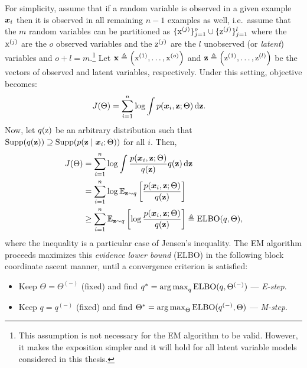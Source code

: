 For simplicity, assume that if a random variable is observed in a given example ${\bm{x}}_i$ then it is observed in all remaining $n-1$ examples as well, i.e.\ assume that the $m$ random variables can be partitioned as $\lbrace {\textnormal{x}}^{(j)} \rbrace_{j=1}^o \cup \lbrace {\textnormal{z}}^{(j)} \rbrace_{j=1}^l$ where the ${\textnormal{x}}^{(j)}$ are the $o$ observed variables and the ${\textnormal{z}}^{(j)}$ are the $l$ unobserved (or \emph{latent}) variables and $o+l=m$.\footnote{This assumption is not necessary for the EM algorithm to be valid. However, it makes the exposition simpler and it will hold for all latent variable models considered in this thesis.} Let ${\mathbf{x}} \triangleq \left({\textnormal{x}}^{(1)}, \dots, {\textnormal{x}}^{(o)} \right)$ and ${\mathbf{z}} \triangleq \left({\textnormal{z}}^{(1)}, \dots, {\textnormal{z}}^{(l)} \right)$ be the vectors of observed and latent variables, respectively. Under this setting, objective  becomes:
\begin{align}
    \label{eq:maximum_marginal_likelihood}
    J(\Theta) &= \sum_{i=1}^n \log \int p({\bm{x}}_i, {\mathbf{z}}; \Theta) {\,\text{d}} {\mathbf{z}}.
\end{align}
Now, let $q({\textnormal{z}})$ be an arbitrary distribution such that $\mathrm{Supp}(q({\mathbf{z}})) \supseteq \mathrm{Supp}(p({\mathbf{z}} \mid {\bm{x}}_i; \Theta))$ for all $i$. Then,
\begingroup
\allowdisplaybreaks
\begin{align}
    J(\Theta) &= \sum_{i=1}^n \log \int \frac{p({\bm{x}}_i, {\mathbf{z}}; \Theta)}{q({\mathbf{z}})} q({\mathbf{z}}) {\,\text{d}} {\mathbf{z}} \nonumber\\
    &= \sum_{i=1}^n \log \mathbb{E}_{{\mathbf{z}} \sim q} \left[ \frac{p({\bm{x}}_i, {\mathbf{z}}; \Theta)} {q({\mathbf{z}})} \right] \nonumber\\
    &\geq \sum_{i=1}^n \mathbb{E}_{{\mathbf{z}} \sim q} \left[ \log  \frac{p({\bm{x}}_i, {\mathbf{z}}; \Theta)}{q({\mathbf{z}})} \right] \triangleq \mathrm{ELBO}(q,\Theta),
\end{align}
\endgroup
where the inequality is a particular case of Jensen's inequality. The EM algorithm proceeds maximizes this \emph{evidence lower bound} (ELBO) in the following block coordinate ascent manner, until a convergence criterion is satisfied:
\begin{itemize}
    \item Keep $\Theta = \Theta^{(-)}$ (fixed) and find $q^* = \operatorname*{arg\,max}_q \mathrm{ELBO}(q, \Theta^{(-)})$ --- \emph{E-step}.
    \item Keep $q = q^{(-)}$ (fixed) and find $\Theta^* = \operatorname*{arg\,max}_\Theta \mathrm{ELBO}(q^{(-)}, \Theta)$ --- \emph{M-step}.
\end{itemize}

